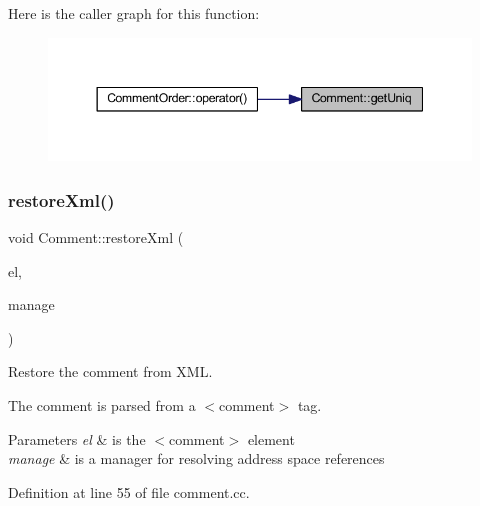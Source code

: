 Here is the caller graph for this function\+:
\nopagebreak
\begin{figure}[H]
\begin{center}
\leavevmode
\includegraphics[width=344pt]{class_comment_aeff445ce0114bebb017213c4abfe0086_icgraph}
\end{center}
\end{figure}
\mbox{\label{class_comment_a191cf541d9b91d88fba9c54c14f5c73d}} 
\subsubsection{\texorpdfstring{restoreXml()}{restoreXml()}}
{\footnotesize\ttfamily void Comment\+::restore\+Xml (\begin{DoxyParamCaption}\item[{const \mbox{\hyperlink{class_element}{Element}} $\ast$}]{el,  }\item[{const \mbox{\hyperlink{class_addr_space_manager}{Addr\+Space\+Manager}} $\ast$}]{manage }\end{DoxyParamCaption})}



Restore the comment from X\+ML. 

The comment is parsed from a $<$comment$>$ tag. 
\begin{DoxyParams}{Parameters}
{\em el} & is the $<$comment$>$ element \\
\hline
{\em manage} & is a manager for resolving address space references \\
\hline
\end{DoxyParams}


Definition at line 55 of file comment.\+cc.

